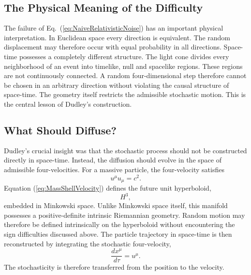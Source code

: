 \subsection{The Physical Meaning of the Difficulty}
The failure of Eq.~(\ref{eq:NaiveRelativisticNoise}) has an important
physical interpretation.
In Euclidean space every direction is equivalent.
The random displacement may therefore occur with equal probability in
all directions.
Space-time possesses a completely different structure.
The light cone divides every neighborhood of an event into timelike,
null and spacelike regions.
These regions are not continuously connected.
A random four-dimensional step therefore cannot be chosen in an
arbitrary direction without violating the causal structure of
space-time.
The geometry itself restricts the admissible stochastic motion.
This is the central lesson of Dudley's construction.
\subsection{What Should Diffuse?}
Dudley's crucial insight was that the stochastic process should not be
constructed directly in space-time.
Instead, the diffusion should evolve in the space of admissible
four-velocities.
For a massive particle,
the four-velocity satisfies
\begin{equation}
u^\mu u_\mu=c^2.
\label{eq:MassShellVelocity}
\end{equation}
Equation (\ref{eq:MassShellVelocity}) defines the future unit
hyperboloid,
\[H^3,\]
embedded in Minkowski space.
Unlike Minkowski space itself,
this manifold possesses a positive-definite intrinsic Riemannian
geometry.
Random motion may therefore be defined intrinsically on the hyperboloid
without encountering the sign difficulties discussed above.
The particle trajectory in space-time is then reconstructed by
integrating the stochastic four-velocity,
\begin{equation}
\frac{dx^\mu}{d\tau}=u^\mu .
\label{eq:VelocityDefinition}
\end{equation}
The stochasticity is therefore transferred from the position to the
velocity.
